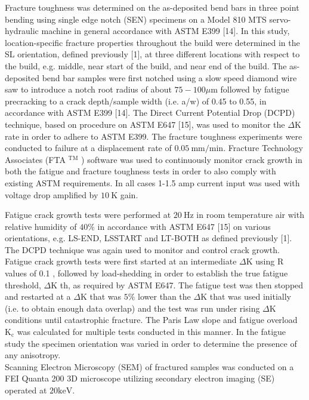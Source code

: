 \documentclass[10pt]{article}
\begin{document}
Fracture toughness was determined on the as-deposited bend bars in three point bending using single edge notch (SEN) specimens on a Model 810 MTS servo-hydraulic machine in general accordance with ASTM E399 [14]. In this study, location-specific fracture properties throughout the build were determined in the SL orientation, defined previously [1], at three different locations with respect to the build, e.g. middle, near start of the build, and near end of the build. The as-deposited bend bar samples were first notched using a slow speed diamond wire saw to introduce a notch root radius of about $75-100 \mu \mathrm{m}$ followed by fatigue precracking to a crack depth/sample width (i.e. a/w) of 0.45 to 0.55, in accordance with ASTM E399 [14]. The Direct Current Potential Drop (DCPD) technique, based on procedure on ASTM E647 [15], was used to monitor the $\Delta \mathrm{K}$ rate in order to adhere to ASTM E399. The fracture toughness experiments were conducted to failure at a displacement rate of $0.05 \mathrm{~mm} / \mathrm{min}$. Fracture Technology Associates (FTA ${ }^{\mathrm{TM}}$ ) software was used to continuously monitor crack growth in both the fatigue and fracture toughness tests in order to also comply with existing ASTM requirements. In all cases 1-1.5 amp current input was used with voltage drop amplified by $10 \mathrm{~K}$ gain.

Fatigue crack growth tests were performed at $20 \mathrm{~Hz}$ in room temperature air with relative humidity of $40 \%$ in accordance with ASTM E647 [15] on various orientations, e.g. LS-END, LSSTART and LT-BOTH as defined previously [1]. The DCPD technique was again used to monitor and control crack growth. Fatigue crack growth tests were first started at an intermediate $\Delta \mathrm{K}$ using $\mathrm{R}$ values of 0.1 , followed by load-shedding in order to establish the true fatigue threshold, $\Delta \mathrm{K}$ th, as required by ASTM E647. The fatigue test was then stopped and restarted at a $\Delta \mathrm{K}$ that was $5 \%$ lower than the $\Delta \mathrm{K}$ that was used initially (i.e. to obtain enough data overlap) and the test was run under rising $\Delta \mathrm{K}$ conditions until catastrophic fracture. The Paris Law slope and fatigue overload $\mathrm{K}_{\mathrm{c}}$ was calculated for multiple tests conducted in this manner. In the fatigue study the specimen orientation was varied in order to determine the presence of any anisotropy.\\
Scanning Electron Microscopy (SEM) of fractured samples was conducted on a FEI Quanta 200 3D microscope utilizing secondary electron imaging (SE) operated at $20 \mathrm{keV}$.
\end{document}
